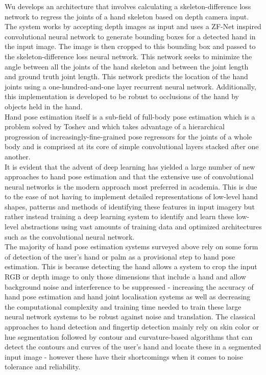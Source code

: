 Wu \cite{hand_pose_occlusions} develops an architecture that involves calculating a skeleton-difference loss network to regress the joints of a hand skeleton based on depth camera input. The system works by accepting depth images as input and uses a ZF-Net \cite{zfnet} inspired convolutional neural network to generate bounding boxes for a detected hand in the input image. The image is then cropped to this bounding box and passed to the skeleton-difference loss neural network. This network seeks to minimize the angle between all the joints of the hand skeleton and between the joint length and ground truth joint length. This network predicts the location of the hand joints using a one-hundred-and-one layer recurrent neural network. Additionally, this implementation is developed to be robust to occlusions of the hand by objects held in the hand.\\

Hand pose estimation itself is a sub-field of full-body pose estimation which is a problem solved by Toshev \cite{deep_pose} and which takes advantage of a hierarchical progression of increasingly-fine-grained pose regressors for the joints of a whole body and is comprised at its core of simple convolutional layers stacked after one another. \\

It is evident that the advent of deep learning has yielded a large number of new approaches to hand pose estimation and that the extensive use of convolutional neural networks is the modern approach most preferred in academia. This is due to the ease of not having to implement detailed representations of low-level hand shapes, patterns and methods of identifying these features in input imagery but rather instead training a deep learning system to identify and learn these low-level abstractions using vast amounts of training data and optimized architectures such as the convolutional neural network. \\

The majority of hand pose estimation systems surveyed above rely on some form of detection of the user's hand or palm as a provisional step to hand pose estimation. This is because detecting the hand allows a system to crop the input RGB or depth image to only those dimensions that include a hand and allow background noise and interference to be suppressed - increasing the accuracy of hand pose estimation and hand joint localisation systems as well as decreasing the computational complexity and training time needed to train these large neural network systems to be robust against noise and translation. The classical approaches to hand detection and fingertip detection mainly rely on skin color or hue segmentation followed by contour and curvature-based algorithms that can detect the contours and curves of the user's hand and locate these in a segmented input image - however these have their shortcomings when it comes to noise tolerance and reliability. \\

